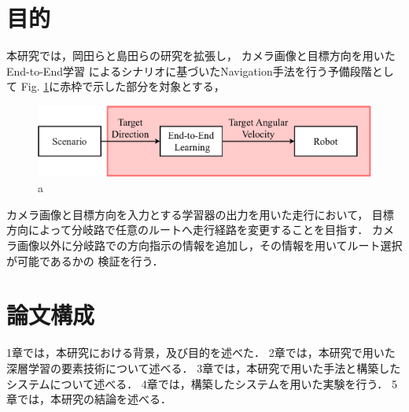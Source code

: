 \section{目的}
本研究では，岡田らと島田らの研究を拡張し，
カメラ画像と目標方向を用いたEnd-to-End学習
によるシナリオに基づいたNavigation手法を行う予備段階として
Fig. \ref{fig::haikei_abs}に赤枠で示した部分を対象とする，
\begin{figure}[H]
    \centering
    \includegraphics[width = 12cm]{./figs/haikei_abs.pdf}
    \caption{a}
    \label{fig::haikei_abs}
\end{figure}

カメラ画像と目標方向を入力とする学習器の出力を用いた走行において，
目標方向によって分岐路で任意のルートへ走行経路を変更することを目指す．
カメラ画像以外に分岐路での方向指示の情報を追加し，その情報を用いてルート選択が可能であるかの
検証を行う．


\section{論文構成}
1章では，本研究における背景，及び目的を述べた．
2章では，本研究で用いた深層学習の要素技術について述べる．
3章では，本研究で用いた手法と構築したシステムについて述べる．
4章では，構築したシステムを用いた実験を行う．
5章では，本研究の結論を述べる．
